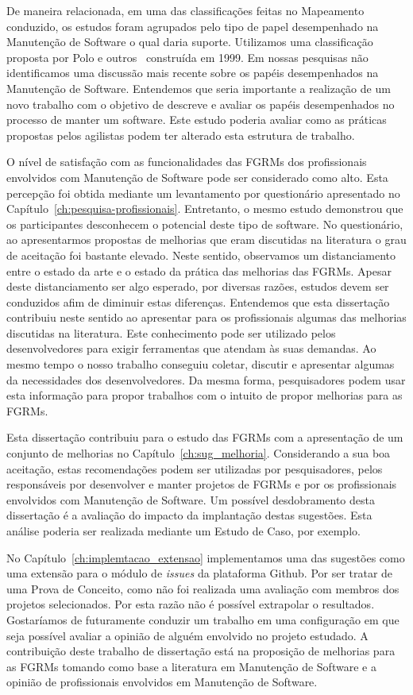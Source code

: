De maneira relacionada, em uma das classificações feitas no Mapeamento
conduzido, os estudos foram agrupados pelo tipo de papel desempenhado na
Manutenção de Software o qual daria suporte. Utilizamos uma classificação
proposta por Polo e outros~\cite{Polo1999} construída em 1999. Em nossas
pesquisas não identificamos uma discussão mais recente sobre os papéis
desempenhados na Manutenção de Software. Entendemos que seria importante a
realização de um novo trabalho com o objetivo de descreve e avaliar os papéis
desempenhados no processo de manter um software. Este estudo poderia avaliar
como as práticas propostas pelos agilistas podem ter alterado esta estrutura de
trabalho.

O nível de satisfação com as funcionalidades das FGRMs dos profissionais
envolvidos com Manutenção de Software pode ser considerado como alto. Esta
percepção foi obtida mediante um levantamento por questionário apresentado no
Capítulo~\ref{ch:pesquisa-profissionais}. Entretanto, o mesmo estudo demonstrou
que os participantes desconhecem o potencial deste tipo de software. No
questionário, ao apresentarmos propostas de melhorias que eram discutidas na
literatura o grau de aceitação foi bastante elevado. Neste sentido, observamos
um distanciamento entre o estado da arte e o estado da prática das melhorias das
FGRMs. Apesar deste distanciamento ser algo esperado, por diversas razões,
estudos devem ser conduzidos afim de diminuir estas diferenças. Entendemos que
esta dissertação contribuiu neste sentido ao apresentar para os profissionais
algumas das melhorias discutidas na literatura. Este conhecimento pode ser
utilizado pelos desenvolvedores para exigir ferramentas que atendam às suas
demandas. Ao mesmo tempo o nosso trabalho conseguiu coletar, discutir e
apresentar algumas da necessidades dos desenvolvedores. Da mesma forma,
pesquisadores podem usar esta informação para propor trabalhos com o intuito de
propor melhorias para as FGRMs.

Esta dissertação contribuiu para o estudo das FGRMs com a apresentação de um
conjunto de melhorias no Capítulo~\ref{ch:sug_melhoria}. Considerando a sua boa
aceitação, estas recomendações podem ser utilizadas por pesquisadores, pelos
responsáveis por desenvolver e manter projetos de FGRMs e por os profissionais
envolvidos com Manutenção de Software. Um possível desdobramento desta
dissertação é a avaliação do impacto da implantação destas sugestões. Esta
análise poderia ser realizada mediante um Estudo de Caso, por exemplo.

No Capítulo~\ref{ch:implemtacao_extensao} implementamos uma das sugestões como
uma extensão para o módulo de \textit{issues} da plataforma Github. Por ser
tratar de uma Prova de Conceito, como não foi realizada uma avaliação com
membros dos projetos selecionados. Por esta razão não é possível extrapolar o
resultados.  Gostaríamos de futuramente conduzir um trabalho em uma configuração
em que seja possível avaliar a opinião de alguém envolvido no projeto estudado.
A contribuição deste trabalho de dissertação está na proposição de melhorias
para as FGRMs tomando como base a literatura em Manutenção de Software e a
opinião de profissionais envolvidos em Manutenção de Software.

